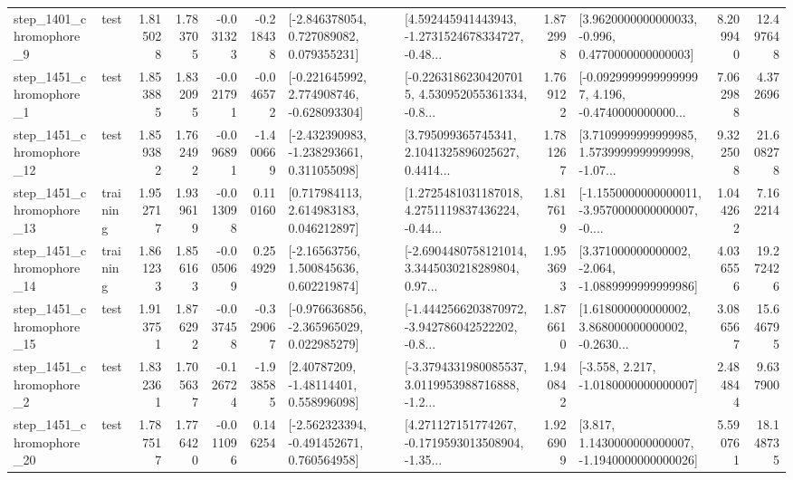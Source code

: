\begin{tabular}{llrrrrllrlrr}
  step\_1401\_chromophore\_9 &      test &      1.815028 &    1.783705 &     -0.031323 & -0.218438 &    [-2.846378054, 0.727089082, 0.079355231] &  [4.592445941443943, -1.2731524678334727, -0.48... &       1.872998 &   [3.9620000000000033, -0.996, 0.4770000000000003] &            8.209940 &         12.497648 \\
  step\_1451\_chromophore\_1 &      test &      1.853885 &    1.832095 &     -0.021791 & -0.046572 &   [-0.221645992, 2.774908746, -0.628093304] &  [-0.22631862304207015, 4.530952055361334, -0.8... &       1.769122 &  [-0.09299999999999997, 4.196, -0.4740000000000... &            7.062988 &          4.372696 \\
 step\_1451\_chromophore\_12 &      test &      1.859382 &    1.762492 &     -0.096891 & -1.400669 &   [-2.432390983, -1.238293661, 0.311055098] &  [3.795099365745341, 2.1041325896025627, 0.4414... &       1.781267 &  [3.7109999999999985, 1.5739999999999998, -1.07... &            9.322508 &         21.608278 \\
 step\_1451\_chromophore\_13 &  training &      1.952717 &    1.939619 &     -0.013098 &  0.110160 &     [0.717984113, 2.614983183, 0.046212897] &  [1.2725481031187018, 4.2751119837436224, -0.44... &       1.817619 &  [-1.1550000000000011, -3.9570000000000007, -0.... &            1.044262 &          7.162214 \\
 step\_1451\_chromophore\_14 &  training &      1.861233 &    1.856163 &     -0.005069 &  0.254929 &     [-2.16563756, 1.500845636, 0.602219874] &  [-2.6904480758121014, 3.3445030218289804, 0.97... &       1.953693 &   [3.371000000000002, -2.064, -1.0889999999999986] &            4.036556 &         19.272426 \\
 step\_1451\_chromophore\_15 &      test &      1.913751 &    1.876292 &     -0.037458 & -0.329067 &   [-0.976636856, -2.365965029, 0.022985279] &  [-1.4442566203870972, -3.942786042522202, -0.8... &       1.876610 &  [1.618000000000002, 3.868000000000002, -0.2630... &            3.086567 &         15.646795 \\
  step\_1451\_chromophore\_2 &      test &      1.832361 &    1.705637 &     -0.126724 & -1.938585 &      [2.40787209, -1.48114401, 0.558996098] &  [-3.3794331980085537, 3.0119953988716888, -1.2... &       1.940842 &               [-3.558, 2.217, -1.0180000000000007] &            2.484844 &          9.637900 \\
 step\_1451\_chromophore\_20 &      test &      1.787517 &    1.776420 &     -0.011096 &  0.146254 &   [-2.562323394, -0.491452671, 0.760564958] &  [4.271127151774267, -0.1719593013508904, -1.35... &       1.926909 &   [3.817, 1.1430000000000007, -1.1940000000000026] &            5.590761 &         18.148735 \\

\end{tabular}

